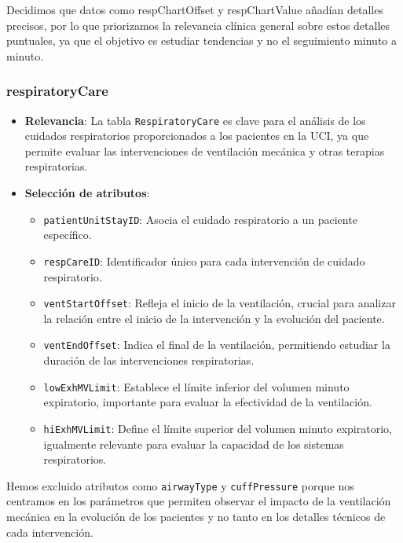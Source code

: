 \documentclass[12pt, a4paper, twoside]{article}
\begin{document}
	Decidimos que datos como respChartOffset y respChartValue añadían detalles precisos, por lo que priorizamos la relevancia clínica general sobre estos detalles puntuales, ya que el objetivo es estudiar tendencias y no el seguimiento minuto a minuto.  \cite{eICU2024}
	
	\subsubsection{respiratoryCare}
	
	\begin{itemize}
		\item \textbf{Relevancia}: La tabla \texttt{RespiratoryCare} es clave para el análisis de los cuidados respiratorios proporcionados a los pacientes en la UCI, ya que permite evaluar las intervenciones de ventilación mecánica y otras terapias respiratorias.
		
		\item \textbf{Selección de atributos}:
		\begin{itemize}
			\item \texttt{patientUnitStayID}: Asocia el cuidado respiratorio a un paciente específico.
			\item \texttt{respCareID}: Identificador único para cada intervención de cuidado respiratorio.
			\item \texttt{ventStartOffset}: Refleja el inicio de la ventilación, crucial para analizar la relación entre el inicio de la intervención y la evolución del paciente.
			\item \texttt{ventEndOffset}: Indica el final de la ventilación, permitiendo estudiar la duración de las intervenciones respiratorias.
			\item \texttt{lowExhMVLimit}: Establece el límite inferior del volumen minuto expiratorio, importante para evaluar la efectividad de la ventilación.
			\item \texttt{hiExhMVLimit}: Define el límite superior del volumen minuto expiratorio, igualmente relevante para evaluar la capacidad de los sistemas respiratorios.
		\end{itemize}
		
	\end{itemize}
	
	Hemos excluido atributos como \texttt{airwayType} y \texttt{cuffPressure} porque nos centramos en los parámetros que permiten observar el impacto de la ventilación mecánica en la evolución de los pacientes y no tanto en los detalles técnicos de cada intervención.\cite{eICU2024}
	
\end{document}
